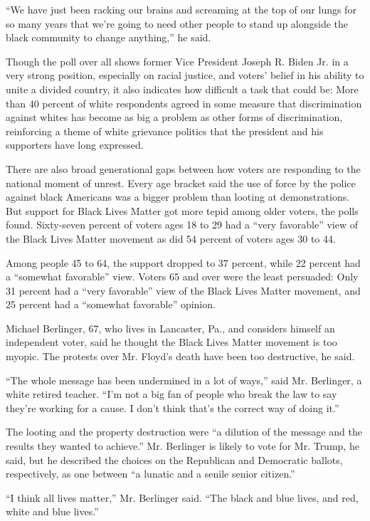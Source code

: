 ``We have just been racking our brains and screaming at the top of our
lungs for so many years that we're going to need other people to stand
up alongside the black community to change anything,'' he said.

Though the poll over all shows former Vice President Joseph R. Biden Jr.
in a very strong position, especially on racial justice, and voters'
belief in his ability to unite a divided country, it also indicates how
difficult a task that could be: More than 40 percent of white
respondents agreed in some measure that discrimination against whites
has become as big a problem as other forms of discrimination,
reinforcing a theme of white grievance politics that the president and
his supporters have long expressed.

There are also broad generational gaps between how voters are responding
to the national moment of unrest. Every age bracket said the use of
force by the police against black Americans was a bigger problem than
looting at demonstrations. But support for Black Lives Matter got more
tepid among older voters, the polls found. Sixty-seven percent of voters
ages 18 to 29 had a ``very favorable'' view of the Black Lives Matter
movement as did 54 percent of voters ages 30 to 44.

Among people 45 to 64, the support dropped to 37 percent, while 22
percent had a ``somewhat favorable'' view. Voters 65 and over were the
least persuaded: Only 31 percent had a ``very favorable'' view of the
Black Lives Matter movement, and 25 percent had a ``somewhat favorable''
opinion.

Michael Berlinger, 67, who lives in Lancaster, Pa., and considers
himself an independent voter, said he thought the Black Lives Matter
movement is too myopic. The protests over Mr. Floyd's death have been
too destructive, he said.

``The whole message has been undermined in a lot of ways,'' said Mr.
Berlinger, a white retired teacher. ``I'm not a big fan of people who
break the law to say they're working for a cause. I don't think that's
the correct way of doing it.''

The looting and the property destruction were ``a dilution of the
message and the results they wanted to achieve.'' Mr. Berlinger is
likely to vote for Mr. Trump, he said, but he described the choices on
the Republican and Democratic ballots, respectively, as one between ``a
lunatic and a senile senior citizen.''

``I think all lives matter,'' Mr. Berlinger said. ``The black and blue
lives, and red, white and blue lives.''

